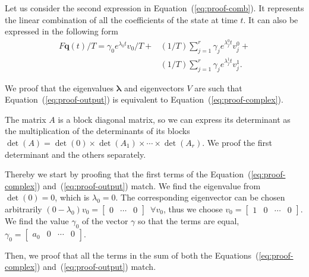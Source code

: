 \documentclass[letterpaper,10pt,journal,twoside]{IEEEtran}
\theoremstyle{definition}
\begin{document}
Let us consider the second expression in Equation~(\ref{eq:proof-comb}). It represents the linear combination of all the coefficients of the state at time $t$. It can also be expressed in the following form
\begin{equation}\label{eq:proof-output}\begin{split}
  F\mathbf{q}(t)/T=\gamma_0 e^{\lambda_0t}v_0/T+&(1/T)\sum_{j=1}^r{\gamma_j e^{\lambda_j^0t}v_j^0}+\\&(1/T)\sum_{j=1}^r{\gamma_j e^{\lambda_j^1t}v_j^1}.
\end{split}\end{equation}

We proof that the eigenvalues $\mathbf{\lambda}$ and eigenvectors $V$ are such that Equation~(\ref{eq:proof-output}) is equivalent to Equation~(\ref{eq:proof-complex}).

The matrix $A$ is a block diagonal matrix, so we can express its determinant as the multiplication of the determinants of its blocks $\det{(A)}=\det{(0)}\times\det{(A_1)}\times\cdots\times\det{(A_r)}$. We proof the first determinant and the others separately.

Thereby we start by proofing that the first terms of the Equation~(\ref{eq:proof-complex}) and~(\ref{eq:proof-output}) match. We find the eigenvalue from $\det(0)=0$, which is $\lambda_0=0$. The corresponding eigenvector can be chosen arbitrarily $(0-\lambda_0)v_0=\begin{bmatrix} 0 & \cdots & 0 \end{bmatrix}\,\,\,\forall v_0$, thus we choose $v_0=\begin{bmatrix}1 & 0 & \cdots & 0\end{bmatrix}$. We find the value $\gamma_0$ of the vector $\gamma$ so that the terms are equal, $\gamma_0=\begin{bmatrix}a_0 & 0 & \cdots & 0\end{bmatrix}$. 

Then, we proof that all the terms in the sum of both the Equations~(\ref{eq:proof-complex}) and~(\ref{eq:proof-output}) match. 
\end{document}
